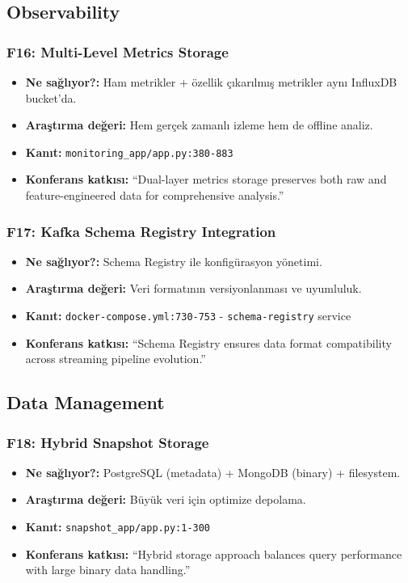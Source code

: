 \documentclass[10pt,a4paper]{article}
\begin{document}
\subsection{Observability}

\subsubsection{F16: Multi-Level Metrics Storage}

\begin{itemize}
\item \textbf{Ne sağlıyor?:} Ham metrikler + özellik çıkarılmış metrikler aynı InfluxDB bucket'da.
\item \textbf{Araştırma değeri:} Hem gerçek zamanlı izleme hem de offline analiz.
\item \textbf{Kanıt:} \texttt{monitoring\_app/app.py:380-883}
\item \textbf{Konferans katkısı:} ``Dual-layer metrics storage preserves both raw and feature-engineered data for comprehensive analysis.''
\end{itemize}

\subsubsection{F17: Kafka Schema Registry Integration}

\begin{itemize}
\item \textbf{Ne sağlıyor?:} Schema Registry ile konfigürasyon yönetimi.
\item \textbf{Araştırma değeri:} Veri formatının versiyonlanması ve uyumluluk.
\item \textbf{Kanıt:} \texttt{docker-compose.yml:730-753} - \texttt{schema-registry} service
\item \textbf{Konferans katkısı:} ``Schema Registry ensures data format compatibility across streaming pipeline evolution.''
\end{itemize}

\subsection{Data Management}

\subsubsection{F18: Hybrid Snapshot Storage}

\begin{itemize}
\item \textbf{Ne sağlıyor?:} PostgreSQL (metadata) + MongoDB (binary) + filesystem.
\item \textbf{Araştırma değeri:} Büyük veri için optimize depolama.
\item \textbf{Kanıt:} \texttt{snapshot\_app/app.py:1-300}
\item \textbf{Konferans katkısı:} ``Hybrid storage approach balances query performance with large binary data handling.''
\end{itemize}
\end{document}
